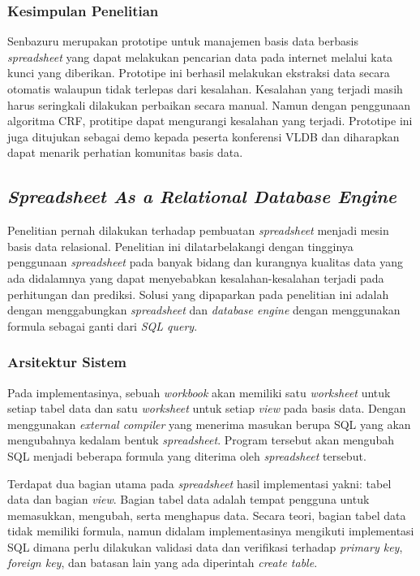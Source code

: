     \subsubsection{Kesimpulan Penelitian}
    Senbazuru merupakan prototipe untuk manajemen basis data berbasis \textit{spreadsheet} yang dapat melakukan pencarian data pada internet melalui kata kunci yang diberikan. Prototipe ini berhasil melakukan ekstraksi data secara otomatis walaupun tidak terlepas dari kesalahan. Kesalahan yang terjadi masih harus seringkali dilakukan perbaikan secara manual. Namun dengan penggunaan algoritma CRF, protitipe dapat mengurangi kesalahan yang terjadi. Prototipe ini juga ditujukan sebagai demo kepada peserta konferensi VLDB dan diharapkan dapat menarik perhatian komunitas basis data.

\subsection{\textit{Spreadsheet As a Relational Database Engine}}
Penelitian \parencite{Tyszkiewicz2010} pernah dilakukan terhadap pembuatan \textit{spreadsheet} menjadi mesin basis data relasional. Penelitian ini dilatarbelakangi dengan tingginya penggunaan \textit{spreadsheet} pada banyak bidang dan kurangnya kualitas data yang ada didalamnya yang dapat menyebabkan kesalahan-kesalahan terjadi pada perhitungan dan prediksi. Solusi yang dipaparkan pada penelitian ini adalah dengan menggabungkan \textit{spreadsheet} dan \textit{database engine} dengan menggunakan formula sebagai ganti dari \textit{SQL query}.

    \subsubsection{Arsitektur Sistem}

    Pada implementasinya, sebuah \textit{workbook} akan memiliki satu \textit{worksheet} untuk setiap tabel data dan satu \textit{worksheet} untuk setiap \textit{view} pada basis data. Dengan menggunakan \textit{external compiler} yang menerima masukan berupa SQL yang akan mengubahnya kedalam bentuk \textit{spreadsheet}. Program tersebut akan mengubah SQL menjadi beberapa formula yang diterima oleh \textit{spreadsheet} tersebut.

    Terdapat dua bagian utama pada \textit{spreadsheet} hasil implementasi yakni: tabel data dan bagian \textit{view}. Bagian tabel data adalah tempat pengguna untuk memasukkan, mengubah, serta menghapus data. Secara teori, bagian tabel data tidak memiliki formula, namun didalam implementasinya mengikuti implementasi SQL dimana perlu dilakukan validasi data dan verifikasi terhadap \textit{primary key}, \textit{foreign key}, dan batasan lain yang ada diperintah \textit{create table}. 


